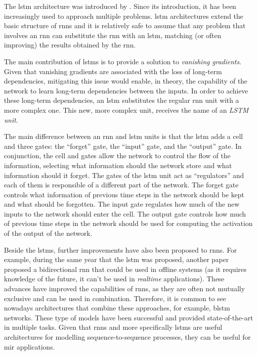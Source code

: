 

The \gls{lstm} architecture was introduced by
\textcite{hochreiter1997long}. Since its introduction, it
has been increasingly used to approach multiple problems.
\gls{lstm} architectures extend the basic structure of
\glspl{rnn} and it is relatively safe to assume that any
problem that involves an \gls{rnn} can substitute the
\gls{rnn} with an \gls{lstm}, matching (or often improving)
the results obtained by the \gls{rnn}.

The main contribution of \glspl{lstm} is to provide a
solution to \emph{vanishing gradients}. Given that vanishing
gradients are associated with the loss of long-term
dependencies, mitigating this issue would enable, in theory,
the capability of the network to learn long-term
dependencies between the inputs. In order to achieve these
long-term dependencies, an \gls{lstm} substitutes the
regular \gls{rnn} unit with a more complex one. This new,
more complex unit, receives the name of an \emph{LSTM unit}.

The main difference between an \gls{rnn} and \gls{lstm}
units is that the \gls{lstm} adds a cell and three gates:
the ``forget'' gate, the ``input'' gate, and the ``output''
gate. In conjunction, the cell and gates allow the network
to control the flow of the information, selecting what
information should the network store and what information
should it forget. The gates of the \gls{lstm} unit act as
``regulators'' and each of them is responsible of a
different part of the network. The forget gate controls what
information of previous time steps in the network should be
kept and what should be forgotten. The input gate regulates
how much of the new inputs to the network should enter the
cell. The output gate controls how much of previous time
steps in the network should be used for computing the
activation of the output of the network.

Beside the \glspl{lstm}, further improvements have also been
proposed to \glspl{rnn}. For example, during the same year
that the \gls{lstm} was proposed, another paper proposed a
bidirectional \gls{rnn} that could be used in offline
systems (as it requires knowledge of the future, it can’t be
used in \emph{realtime} applications). These advances have
improved the capabilities of \glspl{rnn}, as they are often
not mutually exclusive and can be used in combination.
Therefore, it is common to see nowadays architectures that
combine these approaches, for example, \gls{blstm} networks.
These type of models have been successful and provided
state-of-the-art in multiple tasks. Given that \glspl{rnn}
and more specifically \glspl{lstm} are useful architectures
for modelling sequence-to-sequence processes, they can be
useful for \gls{mir} applications.
